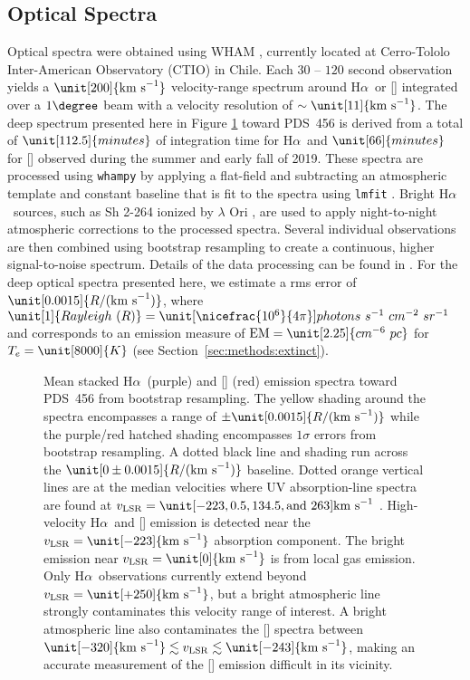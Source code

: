 \documentclass[twocolumn]{aastex63}
\newcommand{\nii}{\ion{N}{2}}
\newcommand{\ha}{H\ensuremath{\alpha}}
\newcommand{\kms}{\mathrm{km~s}\ensuremath{^{-1}}}
\newcommand{\vlsr}{\ensuremath{v_\mathrm{LSR}}}
\begin{document}
\subsection{Optical Spectra}
Optical spectra were obtained using WHAM \citep[][see the WHAM-SS release documentation for details\footnote{\href{http://www.astro.wisc.edu/wham/}{http://www.astro.wisc.edu/wham/}}]{wham-nss, wham-south}, currently located at Cerro-Tololo Inter-American Observatory (CTIO) in Chile. Each $30$ -- $120$ second observation yields a $\unit[200]{\kms}$ velocity-range spectrum around \ha\ or [\nii] integrated over a $1\degree$ beam with a velocity resolution of $\sim \unit[11]{\kms}$. 
The deep spectrum presented here in Figure \ref{fig:OpticalSpectra} toward PDS~456 is derived from a total of $\unit[112.5]{minutes}$ of integration time for \ha\ and $\unit[66]{minutes}$ for [\nii] observed during the summer and early fall of 2019. These spectra are processed using \texttt{whampy} \citep{whampy} by applying a flat-field and subtracting an atmospheric template and constant baseline that is fit to the spectra using \texttt{lmfit} \citep{lmfit}. Bright \ha\ sources, such as Sh 2-264 ionized by $\lambda$ Ori \citep{Sahan2016}, are used to apply night-to-night atmospheric corrections to the processed spectra. Several individual observations are then combined using bootstrap resampling to create a continuous, higher signal-to-noise spectrum. Details of the data processing can be found in \citet{wham-nss}. For the deep optical spectra presented here, we estimate a rms error of $\unit[0.0015]{R/(\kms)}$, where $\unit[1]{Rayleigh~(R)} = \unit[\nicefrac{10^6}{4\pi}]{photons~s^{-1}~cm^{-2}~sr^{-1}}$ and corresponds to an emission measure of $\textrm{EM} = \unit[2.25]{cm^{-6}~pc}$ for $T_e = \unit[8000]{K}$ (see Section~\ref{sec:methods:extinct}).

\begin{figure}[h]
\caption{Mean stacked \ha\ (purple) and [\nii] (red) emission spectra toward PDS~456 from bootstrap resampling. The yellow shading around the spectra encompasses a range of $\pm \unit[0.0015]{R/(\kms)}$ while the purple/red hatched shading encompasses $1\sigma$ errors from bootstrap resampling. A dotted black line and shading run across the $\unit[0 \pm 0.0015]{R/(\kms)}$ baseline. Dotted orange vertical lines are at the median velocities where UV absorption-line spectra are found at $\vlsr = \unit[-223, 0.5, 134.5, \text{and }263]{\kms}$ \citep{Fox2015, Bordoloi2017}. High-velocity \ha\ and [\nii] emission is detected near the $\vlsr = \unit[-223]{\kms}$ absorption component. The bright emission near $\vlsr = \unit[0]{\kms}$ is from local gas emission. Only \ha\ observations currently extend beyond $\vlsr = \unit[+250]{\kms}$, but a bright atmospheric line strongly contaminates this velocity range of interest. A bright atmospheric line also contaminates the [\nii] spectra between $\unit[-320]{\kms} \lesssim \vlsr \lesssim \unit[-243]{\kms}$, making an accurate measurement of the [\nii] emission difficult in its vicinity. \label{fig:OpticalSpectra}}
\end{figure}
\end{document}
